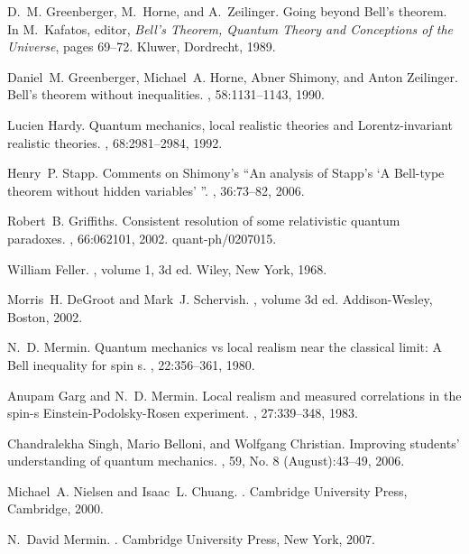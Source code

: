 \documentclass[10pt]{article} %
\begin{document}
\begin{thebibliography}{10}
D.~M. Greenberger, M.~Horne, and A.~Zeilinger.
\newblock Going beyond {B}ell's theorem.
\newblock In M.~Kafatos, editor, {\em Bell's Theorem, Quantum Theory and
  Conceptions of the Universe}, pages 69--72. Kluwer, Dordrecht, 1989.

Daniel~M. Greenberger, Michael~A. Horne, Abner Shimony, and Anton Zeilinger.
\newblock Bell's theorem without inequalities.
, 58:1131--1143, 1990.

Lucien Hardy.
\newblock Quantum mechanics, local realistic theories and {L}orentz-invariant
  realistic theories.
, 68:2981--2984, 1992.

Henry~P. Stapp.
\newblock Comments on {S}himony's ``{A}n analysis of {S}tapp's `{A} {B}ell-type
  theorem without hidden variables' ''.
, 36:73--82, 2006.

Robert~B. Griffiths.
\newblock Consistent resolution of some relativistic quantum paradoxes.
, 66:062101, 2002.
\newblock quant-ph/0207015.

William Feller.
,
  volume 1, 3d ed.
\newblock Wiley, New York, 1968.

Morris~H. DeGroot and Mark~J. Schervish.
, volume 3d ed.
\newblock Addison-Wesley, Boston, 2002.

N.~D. Mermin.
\newblock Quantum mechanics vs local realism near the classical limit: {A}
  {B}ell inequality for spin s.
, 22:356--361, 1980.

Anupam Garg and N.~D. Mermin.
\newblock Local realism and measured correlations in the spin-s
  {E}instein-{P}odolsky-{R}osen experiment.
, 27:339--348, 1983.

Chandralekha Singh, Mario Belloni, and Wolfgang Christian.
\newblock Improving students' understanding of quantum mechanics.
, 59, No. 8 (August):43--49, 2006.

Michael~A. Nielsen and Isaac~L. Chuang.
.
\newblock Cambridge University Press, Cambridge, 2000.

N.~David Mermin.
.
\newblock Cambridge University Press, New York, 2007.


\end{thebibliography}
\end{document}
